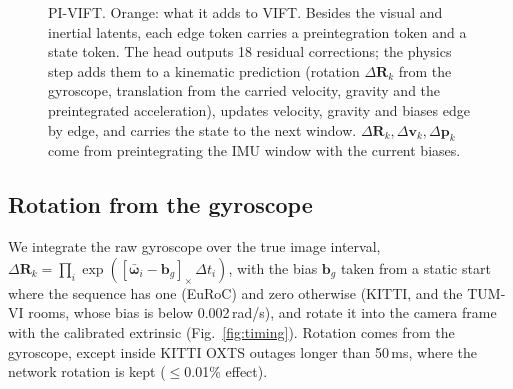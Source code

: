 \documentclass[letterpaper,journal]{IEEEtran}
\begin{document}
\begin{figure}[t]
\caption{PI-VIFT. Orange: what it adds to VIFT. Besides the visual and inertial latents, each edge token carries a preintegration token and a state token. The head outputs 18 residual corrections; the physics step adds them to a kinematic prediction (rotation $\Delta\mathbf R_k$ from the gyroscope, translation from the carried velocity, gravity and the preintegrated acceleration), updates velocity, gravity and biases edge by edge, and carries the state to the next window. $\Delta\mathbf R_k,\Delta\mathbf v_k,\Delta\mathbf p_k$ come from preintegrating the IMU window with the current biases.}
\label{fig:pivift}
\end{figure}

\subsection{Rotation from the gyroscope}
We integrate the raw gyroscope over the true image interval, $\Delta\mathbf{R}_k=\prod_i \exp([\bar{\boldsymbol{\omega}}_i-\mathbf{b}_g]_\times\,\Delta t_i)$, with the bias $\mathbf{b}_g$ taken from a static start where the sequence has one (EuRoC) and zero otherwise (KITTI, and the TUM-VI rooms, whose bias is below 0.002\,rad/s), and rotate it into the camera frame with the calibrated extrinsic (Fig.~\ref{fig:timing}). Rotation comes from the gyroscope, except inside KITTI OXTS outages longer than 50\,ms, where the network rotation is kept ($\le$0.01\% effect).
\end{document}
